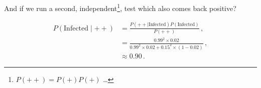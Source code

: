 \noindent And if we run a second, independent\footnote{$P\left(++\right) = P\left(+\right)P\left(+\right)$ \ldots}, test which also comes back positive?

\begin{equation}\label{eq:stats:BayesEx2}
\begin{split}
P\left(\text{Infected} \mid ++\right) &= \frac{P\left(++ \mid \text{Infected}\right) P\left(\text{Infected}\right)}{P\left(++\right)}\,, \\
&= \frac{\num{0.99}^{2} \times \num{0.02}}{\num{0.99}^{2} \times \num{0.02} + \num{0.15}^{2} \times \left(1-\num{0.02}\right)}\,, \\
&\approx \num{0.90}\,.
\end{split}
\end{equation}






